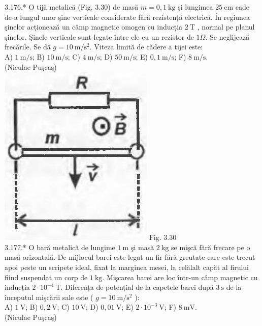 \documentclass[10pt]{article}
\begin{document}
3.176.* O tijă metalică (Fig. 3.30) de masă $m=0,1 \mathrm{~kg}$ şi lungimea $25 \mathrm{~cm}$ cade de-a lungul unor şine verticale considerate fără rezistență electrică. În regiunea şinelor acționează un câmp magnetic omogen cu inducția $2 \mathrm{~T}$ , normal pe planul şinelor. Şinele verticale sunt legate între ele cu un rezistor de $1 \Omega$. Se neglijează frecările. Se dă $g=10 \mathrm{~m} / \mathrm{s}^{2}$. Viteza limită de cădere a tijei este:\\ A) $1 \mathrm{~m} / \mathrm{s}$; B) $10 \mathrm{~m} / \mathrm{s}$; C) $4 \mathrm{~m} / \mathrm{s}$; D) $50 \mathrm{~m} / \mathrm{s}$; E) $0,1 \mathrm{~m} / \mathrm{s}$; F) $8 \mathrm{~m} / \mathrm{s}$.\\ (Niculae Puşcaş)\\ \includegraphics[max width=\textwidth, center]{2025_07_01_5b3ff9fa0d508c8e9f17g-183} Fig. 3.30\\

3.177.* O bară metalică de lungime $1 \mathrm{~m}$ şi masă $2 \mathrm{~kg}$ se mişcă fără frecare pe o masă orizontală. De mijlocul barei este legat un fir fără greutate care este trecut apoi peste un scripete ideal, fixat la marginea mesei, la celălalt capăt al firului fiind suspendat un corp de $1 \mathrm{~kg}$. Mişcarea barei are loc într-un câmp magnetic cu inducția $2 \cdot 10^{-4} \mathrm{~T}$. Diferența de potențial de la capetele barei după $3 \mathrm{~s}$ de la începutul mişcării sale este ( $g=10 \mathrm{~m} / \mathrm{s}^{2}$ ):\\ A) $1 \mathrm{~V}$; B) $0,2 \mathrm{~V}$; C) $10 \mathrm{~V}$; D) $0,01 \mathrm{~V}$; E) $2 \cdot 10^{-3} \mathrm{~V}$; F) $8 \mathrm{~mV}$.\\ (Niculae Puşcaş)\\
\end{document}
